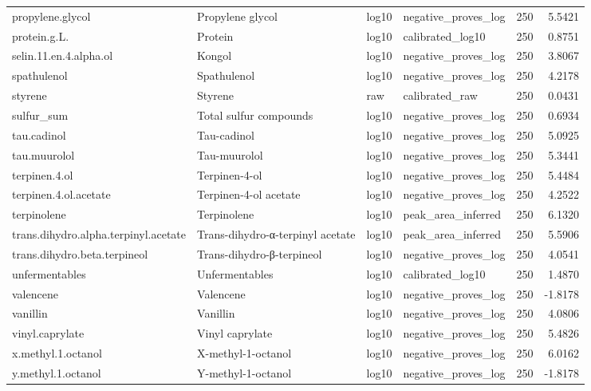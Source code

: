 {\begin{longtable}{llllrr}
propylene.glycol & Propylene glycol & log10 & negative\_proves\_log & 250 & 5.5421 \\
protein.g.L. & Protein & log10 & calibrated\_log10 & 250 & 0.8751 \\
selin.11.en.4.alpha.ol & Kongol & log10 & negative\_proves\_log & 250 & 3.8067 \\
spathulenol & Spathulenol & log10 & negative\_proves\_log & 250 & 4.2178 \\
styrene & Styrene & raw & calibrated\_raw & 250 & 0.0431 \\
sulfur\_sum & Total sulfur compounds & log10 & negative\_proves\_log & 250 & 0.6934 \\
tau.cadinol & Tau-cadinol & log10 & negative\_proves\_log & 250 & 5.0925 \\
tau.muurolol & Tau-muurolol & log10 & negative\_proves\_log & 250 & 5.3441 \\
terpinen.4.ol & Terpinen-4-ol & log10 & negative\_proves\_log & 250 & 5.4484 \\
terpinen.4.ol.acetate & Terpinen-4-ol acetate & log10 & negative\_proves\_log & 250 & 4.2522 \\
terpinolene & Terpinolene & log10 & peak\_area\_inferred & 250 & 6.1320 \\
trans.dihydro.alpha.terpinyl.acetate & Trans-dihydro-α-terpinyl acetate & log10 & peak\_area\_inferred & 250 & 5.5906 \\
trans.dihydro.beta.terpineol & Trans-dihydro-β-terpineol & log10 & negative\_proves\_log & 250 & 4.0541 \\
unfermentables & Unfermentables & log10 & calibrated\_log10 & 250 & 1.4870 \\
valencene & Valencene & log10 & negative\_proves\_log & 250 & -1.8178 \\
vanillin & Vanillin & log10 & negative\_proves\_log & 250 & 4.0806 \\
vinyl.caprylate & Vinyl caprylate & log10 & negative\_proves\_log & 250 & 5.4826 \\
x.methyl.1.octanol & X-methyl-1-octanol & log10 & negative\_proves\_log & 250 & 6.0162 \\
y.methyl.1.octanol & Y-methyl-1-octanol & log10 & negative\_proves\_log & 250 & -1.8178 \\
\end{longtable}
}
